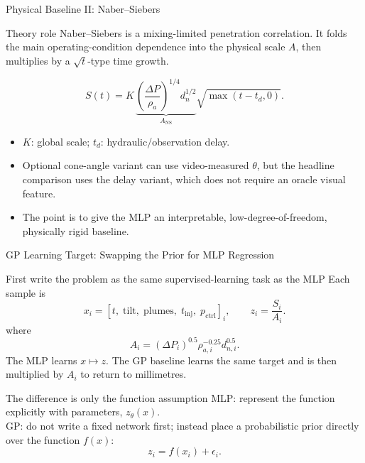 \documentclass[aspectratio=169,11pt]{beamer}
\begin{document}
\begin{frame}{Physical Baseline II: Naber--Siebers}
\small
\begin{block}{Theory role}
\footnotesize
Naber--Siebers is a mixing-limited penetration correlation. It folds the main operating-condition dependence into
the physical scale \(A\), then multiplies by a \(\sqrt{t}\)-type time growth.
\end{block}

\[
S(t)=K\,
\underbrace{\left(\frac{\Delta P}{\rho_a}\right)^{1/4}d_n^{1/2}}_{A_{\mathrm{NS}}}
\sqrt{\max(t-t_d,0)}.
\]

\begin{itemize}
  \item \(K\): global scale; \(t_d\): hydraulic/observation delay.
  \item Optional cone-angle variant can use video-measured \(\theta\), but the headline comparison uses the delay
  variant, which does not require an oracle visual feature.
  \item The point is to give the MLP an interpretable, low-degree-of-freedom, physically rigid baseline.
\end{itemize}
\end{frame}

\begin{frame}{GP Learning Target: Swapping the Prior for MLP Regression}
\small
\begin{block}{First write the problem as the same supervised-learning task as the MLP}
\footnotesize
Each sample is
\[
x_i=[t,\;\mathrm{tilt},\;\mathrm{plumes},\;t_{\mathrm{inj}},\;p_{\mathrm{ctrl}}]_i,
\qquad
z_i=\frac{S_i}{A_i}.
\]
where
\[
A_i=(\Delta P_i)^{0.5}\rho_{a,i}^{-0.25}d_{n,i}^{0.5}.
\]
The MLP learns \(x\mapsto z\). The GP baseline learns the same target and is then multiplied by \(A_i\) to return
to millimetres.
\end{block}

\begin{block}{The difference is only the function assumption}
\footnotesize
MLP: represent the function explicitly with parameters, \(z_\theta(x)\).\\
GP: do not write a fixed network first; instead place a probabilistic prior directly over the function \(f(x)\):
\[
z_i=f(x_i)+\epsilon_i.
\]
\end{block}
\end{frame}
\end{document}
